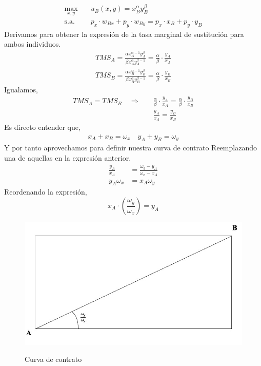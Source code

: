 \begin{align*}
    \max_{x,y} &\quad u_B(x,y) = x_B^\alpha y_B^{\beta}\quad \\
    \text{s.a.} &\quad p_x \cdot w_{Bx} + p_y \cdot w_{By} = p_x \cdot x_B + p_y \cdot y_B
\end{align*}
Derivamos para obtener la expresión de la tasa marginal de sustitución para ambos individuos. 
\begin{align*}
    TMS_A  = \frac{\alpha x_A^{\alpha -1} y_A^{\beta}}{\beta x_A^\alpha y_A^{\beta -1} } = \frac{\alpha}{\beta} \cdot \frac{y_A}{x_A} \\
    TMS_B= \frac{\alpha x_B^{\alpha -1} y_B^{\beta}}{\beta x_B^\alpha y_B^{\beta -1} } = \frac{\alpha}{\beta} \cdot \frac{y_B}{x_B} 
\end{align*}
Igualamos,
\begin{align*}
    TMS_A = TMS_B \quad \Longrightarrow \quad& \frac{\alpha}{\beta} \cdot \frac{y_A}{x_A} = \frac{\alpha}{\beta} \cdot \frac{y_B}{x_B} \\
   &  \frac{y_A}{x_A} = \frac{y_B}{x_B}
\end{align*}
Es directo entender que,
\begin{align*}
    x_A + x_B = \omega_x \quad 
    y_A + y_B = \omega_y
\end{align*}
Y por tanto aprovechamos para definir nuestra curva de contrato Reemplazando una de aquellas en la expresión anterior.
\begin{align*}
    \frac{y_A}{x_A} &= \frac{\omega_y - y_A}{\omega_x - x_A} \\
    y_A\omega_x &= x_A\omega_y
\end{align*}
Reordenando la expresión,
\begin{equation}
    x_A \cdot \left( \frac{\omega_y}{ \omega_x} \right) = y_A \label{eq:curva de contrato}
\end{equation}
\begin{figure}[htbp]
    \centering
    \caption{Curva de contrato}
    \includegraphics[width=\textwidth]{Figuras/EG Curva de contrato.jpeg}
    \label{fig:diapositiva3}
\end{figure}
